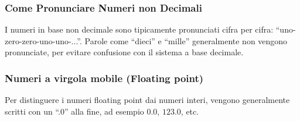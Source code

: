 \subsubsection{Come Pronunciare Numeri non Decimali}

I numeri in base non decimale sono tipicamente pronunciati cifra per cifra: ``uno-zero-zero-uno-uno-...''.
Parole come ``dieci'' e ``mille'' generalmente non vengono pronunciate, per evitare confusione con il sistema a base decimale.

\subsubsection{Numeri a virgola mobile (Floating point)}

Per distinguere i numeri floating point dai numeri interi, vengono generalmente scritti con un ``.0'' alla fine,
ad esempio $0.0$, $123.0$, etc.

